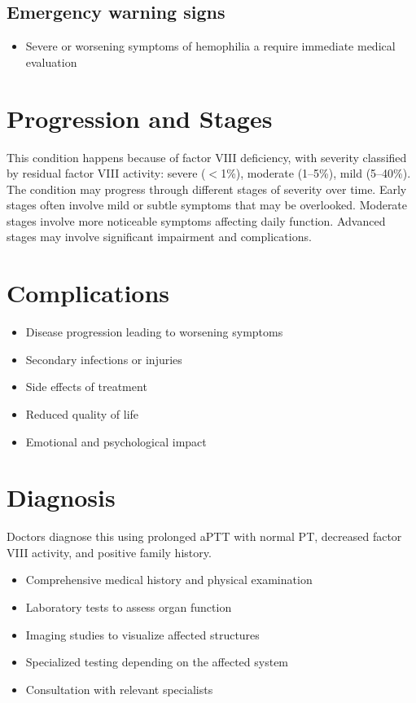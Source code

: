 \subsection{Emergency warning signs}
\begin{itemize}[noitemsep]
  \item Severe or worsening symptoms of hemophilia a require immediate medical evaluation
\end{itemize}
\section{Progression and Stages}
This condition happens because of factor VIII deficiency, with severity classified by residual factor VIII activity: severe ($<$1\%), moderate (1--5\%), mild (5--40\%). The condition may progress through different stages of severity over time. Early stages often involve mild or subtle symptoms that may be overlooked. Moderate stages involve more noticeable symptoms affecting daily function. Advanced stages may involve significant impairment and complications.
\section{Complications}
\begin{itemize}[noitemsep]
  \item Disease progression leading to worsening symptoms
  \item Secondary infections or injuries
  \item Side effects of treatment
  \item Reduced quality of life
  \item Emotional and psychological impact
\end{itemize}
\section{Diagnosis}
Doctors diagnose this using prolonged aPTT with normal PT, decreased factor VIII activity, and positive family history.

\begin{itemize}[noitemsep]
  \item Comprehensive medical history and physical examination
  \item Laboratory tests to assess organ function
  \item Imaging studies to visualize affected structures
  \item Specialized testing depending on the affected system
  \item Consultation with relevant specialists
\end{itemize}

